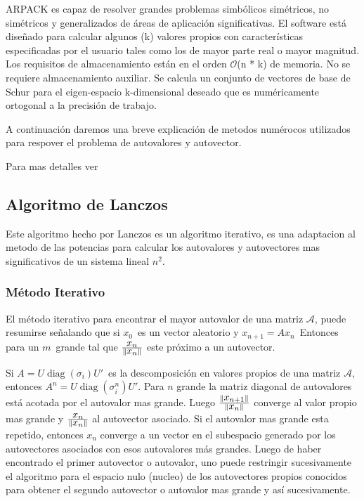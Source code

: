 \documentclass[a4paper,openright,12pt, oneside]{book}
\DeclarePairedDelimiter\norm{\lVert}{\rVert}
\DeclareRobustCommand{\orderof}{\ensuremath{\mathcal{O}}}
\begin{document}
ARPACK es capaz de resolver grandes problemas simb\'olicos sim\'etricos, no sim\'etricos y generalizados de \'areas de aplicaci\'on significativas. El software est\'a dise\~nado para calcular algunos (k) valores propios con caracter\'isticas especificadas por el usuario tales como los de mayor parte real o mayor magnitud. Los requisitos de almacenamiento est\'an en el orden \orderof(n * k) de memoria. No se requiere almacenamiento auxiliar. Se calcula un conjunto de vectores de base de Schur para el eigen-espacio k-dimensional deseado que es num\'ericamente ortogonal a la precisi\'on de trabajo.

A continuaci\'on daremos una breve explicaci\'on de metodos num\'erocos utilizados para respover el problema de autovalores y autovector.

Para mas detalles ver \cite{libromagico}

\subsection{Algoritmo de Lanczos}

Este algoritmo hecho por Lanczos es un algoritmo iterativo, es una adaptacion al metodo de las potencias para calcular los autovalores y autovectores mas significativos de un sistema lineal $n^{2}$.

\subsubsection{M\'etodo Iterativo}
El m\'etodo iterativo para encontrar el mayor autovalor de una matriz $\mathcal{A}$, puede resumirse se\~nalando que si ${\displaystyle x_{0}\,}$ es un vector aleatorio y ${\displaystyle x_{n+1}=Ax_{n}\,}$
Entonces para un ${\displaystyle m\,}$ grande tal que 
$
\frac{
  \displaystyle x_{n}
} 
{
  \norm{{
    \displaystyle x_{n} 
    }}
} 
$ este pr\'oximo a un autovector.

Si ${\displaystyle A=U\operatorname {diag} (\sigma _{i})U'\,} $ es la descomposici\'on en valores propios de una matriz $\mathcal{A}$, entonces ${\displaystyle A^{n}=U\operatorname {diag} (\sigma _{i}^{n})U'}$. Para $\displaystyle n$ grande la matriz diagonal de autovalores est\'a acotada por el autovalor mas grande. Luego 
$
\frac{
  \norm{{\displaystyle x_{n+1}}}
} 
{
  \norm{{
    \displaystyle x_{n} 
    }}
} 
$ converge al valor propio mas grande y 
$
\frac{
  \displaystyle x_{n}
} 
{
  \norm{{
    \displaystyle x_{n} 
    }}
} 
$ al autovector asociado. Si el autovalor mas grande esta repetido, entonces $\displaystyle x_{n} $ converge a un vector en el subespacio generado por los autovectores asociados con esos autovalores m\'as grandes. Luego de haber encontrado el primer autovector o autovalor, uno puede restringir sucesivamente el algoritmo para el espacio nulo (nucleo) de los autovectores propios conocidos para obtener el segundo autovector o autovalor mas grande y as\'i sucesivamente.
\end{document}

